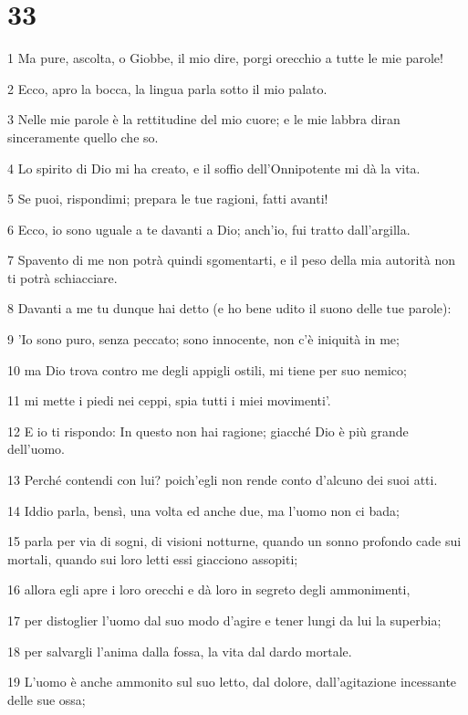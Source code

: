 \chapter{33}

\par 1 Ma pure, ascolta, o Giobbe, il mio dire, porgi orecchio a tutte le mie parole!
\par 2 Ecco, apro la bocca, la lingua parla sotto il mio palato.
\par 3 Nelle mie parole è la rettitudine del mio cuore; e le mie labbra diran sinceramente quello che so.
\par 4 Lo spirito di Dio mi ha creato, e il soffio dell'Onnipotente mi dà la vita.
\par 5 Se puoi, rispondimi; prepara le tue ragioni, fatti avanti!
\par 6 Ecco, io sono uguale a te davanti a Dio; anch'io, fui tratto dall'argilla.
\par 7 Spavento di me non potrà quindi sgomentarti, e il peso della mia autorità non ti potrà schiacciare.
\par 8 Davanti a me tu dunque hai detto (e ho bene udito il suono delle tue parole):
\par 9 'Io sono puro, senza peccato; sono innocente, non c'è iniquità in me;
\par 10 ma Dio trova contro me degli appigli ostili, mi tiene per suo nemico;
\par 11 mi mette i piedi nei ceppi, spia tutti i miei movimenti'.
\par 12 E io ti rispondo: In questo non hai ragione; giacché Dio è più grande dell'uomo.
\par 13 Perché contendi con lui? poich'egli non rende conto d'alcuno dei suoi atti.
\par 14 Iddio parla, bensì, una volta ed anche due, ma l'uomo non ci bada;
\par 15 parla per via di sogni, di visioni notturne, quando un sonno profondo cade sui mortali, quando sui loro letti essi giacciono assopiti;
\par 16 allora egli apre i loro orecchi e dà loro in segreto degli ammonimenti,
\par 17 per distoglier l'uomo dal suo modo d'agire e tener lungi da lui la superbia;
\par 18 per salvargli l'anima dalla fossa, la vita dal dardo mortale.
\par 19 L'uomo è anche ammonito sul suo letto, dal dolore, dall'agitazione incessante delle sue ossa;
